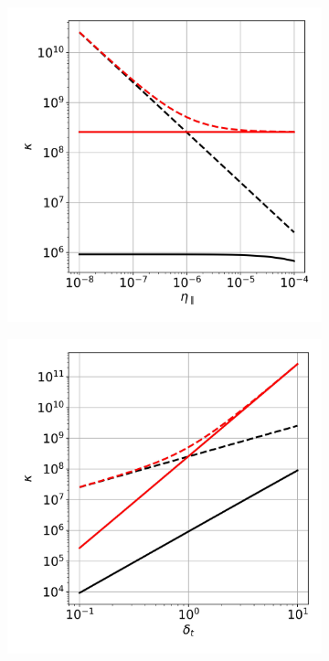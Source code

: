 \begin{figure}[H]
	\centering
	\begin{subfigure}[t]{0.30\textwidth}
		\centering
		\includegraphics[width=1\textwidth]{schemes/conditionNumber_eta.jpg}
		\label{fig:Impl_conditionNumber_eta}
	\end{subfigure}
	\begin{subfigure}[t]{0.30\textwidth}
		\centering
		\includegraphics[width=1\textwidth]{schemes/conditionNumber_dt.jpg}

\end{subfigure}
\end{figure}

